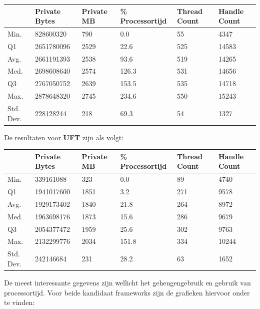 \begin{longtable}{llllll}
          & Private Bytes & Private MB & \% Processortijd & Thread Count & Handle Count \\
\endhead
%
Min.      & 828600320     & 790        & 0.0              & 55           & 4347         \\
Q1        & 2651780096    & 2529       & 22.6             & 525          & 14583        \\
Avg.      & 2661191393    & 2538       & 93.6             & 519          & 14265        \\
Med.      & 2698608640    & 2574       & 126.3            & 531          & 14656        \\
Q3        & 2767050752    & 2639       & 153.5            & 535          & 14718        \\
Max.      & 2878648320    & 2745       & 234.6            & 550          & 15243        \\
Std. Dev. & 228128244     & 218        & 69.3             & 54           & 1327        
\end{longtable}

De resultaten voor \textbf{UFT} zijn als volgt:

\begin{longtable}{llllll}
          & Private Bytes & Private MB & \% Processortijd & Thread Count & Handle Count \\
\endhead
%
Min.      & 339161088     & 323        & 0.0              & 89           & 4740         \\
Q1        & 1941017600    & 1851       & 3.2              & 271          & 9578         \\
Avg.      & 1929173402    & 1840       & 21.8             & 264          & 8972         \\
Med.      & 1963698176    & 1873       & 15.6             & 286          & 9679         \\
Q3        & 2054377472    & 1959       & 25.6             & 302          & 9763         \\
Max.      & 2132299776    & 2034       & 151.8            & 334          & 10244        \\
Std. Dev. & 242146684     & 231        & 28.2             & 63           & 1652        
\end{longtable}

De meest interessante gegevens zijn wellicht het geheugengebruik en gebruik van processortijd. Voor beide kandidaat frameworks zijn de grafieken hiervoor onder te vinden:

